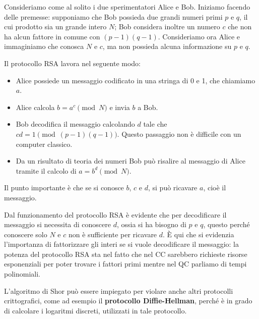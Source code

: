 \begin{esempio}
    Consideriamo come al solito i due sperimentatori Alice e Bob. Iniziamo facendo delle premesse: supponiamo che Bob possieda due grandi numeri primi $p$ e $q$, il cui prodotto sia un grande intero $N$; Bob considera inoltre un numero $c$ che non ha alcun fattore in comune con $(p-1)(q-1)$. Consideriamo ora Alice e immaginiamo che conosca $N$ e $c$, ma non possieda alcuna informazione su $p$ e $q$.
    
    \noindent Il protocollo RSA lavora nel seguente modo:
    \begin{itemize}
        \item Alice possiede un messaggio codificato in una stringa di 0 e 1, che chiamiamo $a$. 
        \item Alice calcola $b=a^c\pmod N$ e invia $b$ a Bob.
        \item Bob decodifica il messaggio calcolando $d$ tale che $cd=1 \pmod{(p-1)(q-1)}$. Questo passaggio non è difficile con un computer classico.
        \item Da un risultato di teoria dei numeri Bob può risalire al messaggio di Alice tramite il calcolo di $a = b^d\pmod N$.
    \end{itemize}
    Il punto importante è che se si conosce $b$, $c$ e $d$, si può ricavare $a$, cioè il messaggio.
\end{esempio}

\noindent Dal funzionamento del protocollo RSA è evidente che per decodificare il messaggio si necessita di conoscere $d$, ossia si ha bisogno di $p$ e $q$, questo perché conoscere solo $N$ e $c$ non è sufficiente per ricavare $d$. È qui che si evidenzia l'importanza di fattorizzare gli interi se si vuole decodificare il messaggio: la potenza del protocollo RSA sta nel fatto che nel CC sarebbero richieste risorse esponenziali per poter trovare i fattori primi mentre nel QC parliamo di tempi polinomiali. 

\noindent L'algoritmo di Shor può essere impiegato per violare anche altri protocolli crittografici, come ad esempio il \textbf{protocollo Diffie-Hellman}, perché è in grado di calcolare i logaritmi discreti, utilizzati in tale protocollo.


